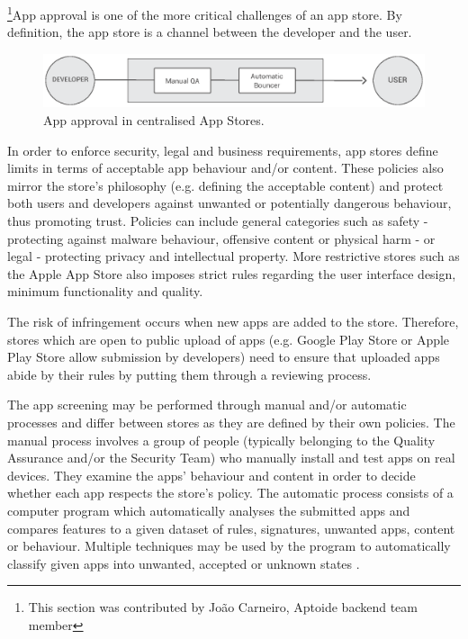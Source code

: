 \footnote{This section was contributed by Jo\~ao Carneiro, Aptoide backend team member}App approval is one of the more critical challenges of an app store. By definition, the app store is a channel between the developer and the user.

\begin{figure}[!ht]
\centering
\includegraphics[width=\textwidth]{diagrams/apps_approval_flow.eps}
\caption{App approval in centralised App Stores.}
\label{fig:app_approval_flow}
\end{figure}

In order to enforce security, legal and business requirements, app stores define limits in terms of acceptable app behaviour and/or content. These policies also mirror the store's philosophy (e.g. defining the acceptable content) and protect both users and developers against unwanted or potentially dangerous behaviour, thus promoting trust. Policies can include general categories such as safety - protecting against malware behaviour, offensive content or physical harm - or legal - protecting privacy and intellectual property. More restrictive stores such as the Apple App Store also imposes strict rules regarding the user interface design, minimum functionality and quality. \cite{GooglePolicyWebsite} \cite{ApplePolicyWebsite}


The risk of infringement occurs when new apps are added to the store. Therefore, stores which are open to public upload of apps (e.g. Google Play Store or Apple Play Store allow submission by developers) need to ensure that uploaded apps abide by their rules by putting them through a reviewing process. 

The app screening may be performed through manual and/or automatic processes and differ between stores as they are defined by their own policies. The manual process involves a group of people (typically belonging to the Quality Assurance and/or the Security Team) who manually install and test apps on real devices. They examine the apps' behaviour and content in order to decide whether each app respects the store's policy. The automatic process consists of a computer program which automatically analyses the submitted apps and compares features to a given dataset of rules, signatures, unwanted apps, content or behaviour. Multiple techniques may be used by the program to automatically classify given apps into unwanted, accepted or unknown states \cite{Bhattacharya2017}.

